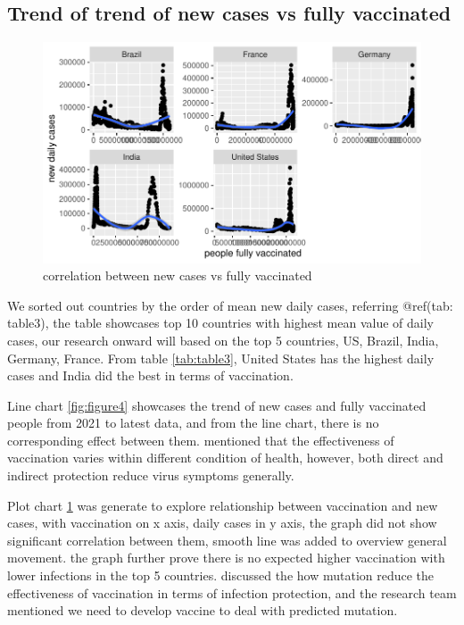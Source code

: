 \documentclass[11pt,a4paper,]{article}
\begin{document}
\clearpage

\subsection*{Trend of trend of new cases vs fully vaccinated}

\begin{figure}

{\centering \includegraphics{report_files/figure-latex/figure5-1} 

}

\caption{correlation between new cases vs fully vaccinated}\label{fig:figure5}
\end{figure}

We sorted out countries by the order of mean new daily cases, referring @ref(tab: table3), the table showcases top 10 countries with highest mean value of daily cases, our research onward will based on the top 5 countries, US, Brazil, India, Germany, France. From table \ref{tab:table3}, United States has the highest daily cases and India did the best in terms of vaccination.

Line chart \ref{fig:figure4} showcases the trend of new cases and fully vaccinated people from 2021 to latest data, and from the line chart, there is no corresponding effect between them. \textcite{lipsitch2020understanding} mentioned that the effectiveness of vaccination varies within different condition of health, however, both direct and indirect protection reduce virus symptoms generally.

Plot chart \ref{fig:figure5} was generate to explore relationship between vaccination and new cases, with vaccination on x axis, daily cases in y axis, the graph did not show significant correlation between them, smooth line was added to overview general movement. the graph further prove there is no expected higher vaccination with lower infections in the top 5 countries. \textcite{chen2021prediction} discussed the how mutation reduce the effectiveness of vaccination in terms of infection protection, and the research team mentioned we need to develop vaccine to deal with predicted mutation.
\end{document}
